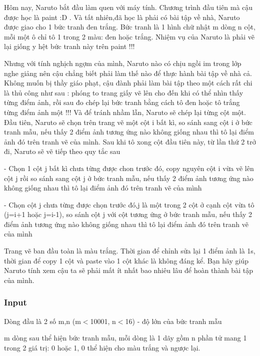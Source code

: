 



   Hôm nay, Naruto bắt đầu làm quen với máy tính. Chương trình đầu tiên mà cậu được học là paint :D . Và tất nhiên,đã học là phải có bài tập về nhà, Naruto được giao cho 1 bức tranh đen trắng. Bức tranh là 1 hình chữ nhật m dòng n cột, mỗi một ô chỉ tô 1 trong 2 màu: đen hoặc trắng. Nhiệm vụ của Naruto là phải vẽ lại giống y hệt bức tranh này trên paint !!!  

   Nhưng với tính nghịch ngợm của mình, Naruto nào có chịu ngồi im trong lớp nghe giảng nên cậu chẳng biết phải làm thế nào để thực hành bài tập về nhà cả. Không muốn bị thầy giáo phạt, cậu đành phải làm bài tập theo một cách rất chi là thủ công như sau : phóng to trang giấy vẽ lên cho đến khi có thể nhìn thấy từng điểm ảnh, rồi sau đo chép lại bức tranh bằng cách tô đen hoặc tô trắng từng điểm ảnh một !!! Và để tránh nhầm lẫn, Naruto sẽ chép lại từng cột một. Đầu tiên, Naruto sẽ chọn trên trang vẽ một cột i bất kì, so sánh sang cột i ở bức tranh mẫu, nếu thấy 2 điểm ảnh tương ứng nào không giống nhau thì tô lại điểm ảnh đó trên tranh vẽ của mình. Sau khi tô xong cột đầu tiên này, từ lần thứ 2 trở đi, Naruto sẽ vẽ tiếp theo quy tắc sau  

   - Chọn 1 cột j bất kì chưa từng được chon trước đó, copy nguyên cột i vừa vẽ lên cột j rồi so sánh sang cột j ở bức tranh mẫu, nếu thấy 2 điểm ảnh tương ứng nào không giống nhau thì tô lại điểm ảnh đó trên tranh vẽ của mình  

   - Chọn cột j chưa từng được chọn trước đó,j là một trong 2 cột ở cạnh cột vừa tô (j=i+1 hoặc j=i-1), so sánh cột j với cột tương ứng ở bức tranh mẫu, nếu thấy 2 điểm ảnh tương ứng nào không giống nhau thì tô lại điểm ảnh đó trên tranh vẽ của mình  

   Trang vẽ ban đầu toàn là màu trắng. Thời gian để chỉnh sửa lại 1 điểm ảnh là 1s, thời gian để copy 1 cột và paste vào 1 cột khác là không đáng kể. Bạn hãy giúp Naruto tính xem cậu ta sẽ phải mất ít nhất bao nhiêu lâu để hoàn thành bài tập của mình.  

\subsubsection{   Input  }

   Dòng đầu là 2 số m,n (m$<$10001, n$<$16) - độ lớn của bức tranh mẫu  

   m dòng sau thể hiện bức tranh mẫu, mỗi dòng là 1 dãy gồm n phần tử mang 1 trong 2 giá trị: 0 hoặc 1, 0 thể hiện cho màu trắng và ngược lại.  

